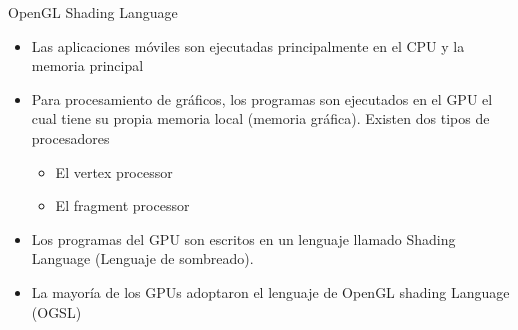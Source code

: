 




	
\begin{frame}{OpenGL Shading Language}
\begin{itemize}
\item Las aplicaciones móviles son ejecutadas principalmente en el CPU y la memoria principal
\item Para procesamiento de gráficos, los programas son ejecutados en el GPU el cual tiene su propia memoria local (memoria gráfica). Existen dos tipos de procesadores
\begin{itemize}
\item El vertex processor
\item El fragment processor
\end{itemize}
\item Los programas del GPU son escritos en un lenguaje llamado Shading Language (Lenguaje de sombreado). 
\item La mayoría de los GPUs adoptaron el lenguaje de OpenGL shading Language (OGSL)
\end{itemize}
\end{frame}




